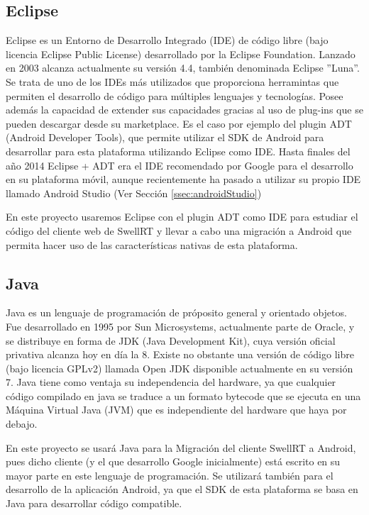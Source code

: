     \subsection{Eclipse}\label{ssec:eclipse} 
    
	Eclipse \cite{ref:eclipse} es un Entorno de Desarrollo Integrado (IDE) de código libre (bajo licencia Eclipse Public License) desarrollado por la Eclipse Foundation. Lanzado en 2003 alcanza actualmente su versión 4.4, también denominada Eclipse ''Luna''. Se trata de uno de los IDEs más utilizados que proporciona herramintas que permiten el desarrollo de código para múltiples lenguajes y tecnologías. Posee además la capacidad de extender sus capacidades gracias al uso de plug-ins que se pueden descargar desde su marketplace. Es el caso por ejemplo del plugin ADT (Android Developer Tools), que permite utilizar el SDK de Android para desarrollar para esta plataforma utilizando Eclipse como IDE. Hasta finales del año 2014 Eclipse + ADT era el IDE recomendado por Google para el desarrollo en su plataforma móvil, aunque recientemente ha pasado a utilizar su propio IDE llamado Android Studio (Ver Sección \ref{ssec:androidStudio})
	
	En este proyecto usaremos Eclipse con el plugin ADT como IDE para estudiar el código del cliente web de SwellRT y llevar a cabo una migración a Android que permita hacer uso de las características nativas de esta plataforma.
    
    \subsection{Java}\label{ssec:java}
    
	Java \cite{ref:java} es un lenguaje de programación de próposito general y orientado objetos. Fue desarrollado en 1995 por Sun Microsystems, actualmente parte de Oracle, y se distribuye en forma de JDK (Java Development Kit), cuya versión oficial privativa alcanza hoy en día la 8. Existe no obstante una versión de código libre (bajo licencia GPLv2) llamada Open JDK \cite{ref:openjdk} disponible actualmente en su versión 7. Java tiene como ventaja su independencia del hardware, ya que cualquier código compilado en java se traduce a un formato bytecode que se ejecuta en una Máquina Virtual Java (JVM) que es independiente del hardware que haya por debajo.
	
	En este proyecto se usará Java para la Migración del cliente SwellRT a Android, pues dicho cliente (y el que desarrollo Google inicialmente) está escrito en su mayor parte en este lenguaje de programación. Se utilizará también para el desarrollo de la aplicación Android, ya que el SDK de esta plataforma se basa en Java para desarrollar código compatible.
    
